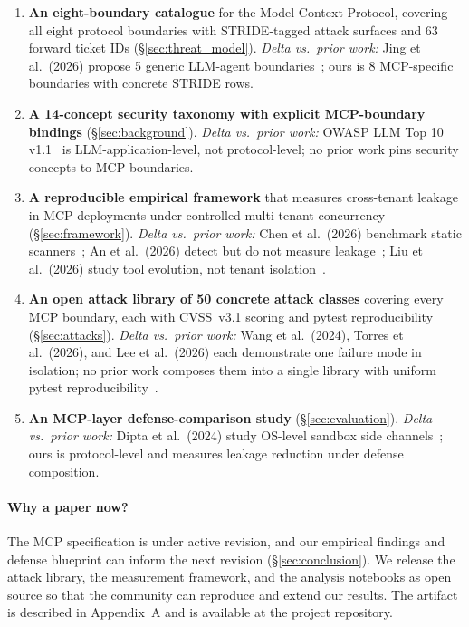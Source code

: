 \begin{enumerate}
  \item \textbf{An eight-boundary catalogue} for the Model Context
        Protocol, covering all eight protocol boundaries with
        STRIDE-tagged attack surfaces and 63 forward ticket IDs
        (\S\ref{sec:threat_model}). \emph{Delta vs.\ prior work:}
        Jing et al.~(2026) propose 5 generic LLM-agent
        boundaries~\cite{jing_2026_isolation}; ours is 8
        MCP-specific boundaries with concrete STRIDE rows.
  \item \textbf{A 14-concept security taxonomy with explicit
        MCP-boundary bindings} (\S\ref{sec:background}).
        \emph{Delta vs.\ prior work:} OWASP LLM Top 10
        v1.1~\cite{owasp_llm_top10_v11} is LLM-application-level,
        not protocol-level; no prior work pins security concepts
        to MCP boundaries.
  \item \textbf{A reproducible empirical framework} that measures
        cross-tenant leakage in MCP deployments under controlled
        multi-tenant concurrency (\S\ref{sec:framework}).
        \emph{Delta vs.\ prior work:} Chen et al.~(2026)
        benchmark static scanners~\cite{chen_2026_mcp_security};
        An et al.~(2026) detect but do not measure
        leakage~\cite{an_2026_flowguard}; Liu et al.~(2026) study
        tool evolution, not tenant
        isolation~\cite{liu_2026_mcpevol}.
  \item \textbf{An open attack library of 50 concrete attack
        classes} covering every MCP boundary, each with CVSS~v3.1
        scoring and pytest reproducibility (\S\ref{sec:attacks}).
        \emph{Delta vs.\ prior work:} Wang et al.~(2024),
        Torres et al.~(2026), and Lee et al.~(2026) each
        demonstrate one failure mode in isolation; no prior work
        composes them into a single library with uniform pytest
        reproducibility~\cite{wang_2024_toolcommander,
        torres_2026_memory,lee_2026_webmcp}.
  \item \textbf{An MCP-layer defense-comparison study}
        (\S\ref{sec:evaluation}). \emph{Delta vs.\ prior work:}
        Dipta et al.~(2024) study OS-level sandbox side
        channels~\cite{dipta_2024_sandbox}; ours is
        protocol-level and measures leakage reduction under
        defense composition.
\end{enumerate}

\paragraph{Why a paper now?}
The MCP specification is under active revision, and our
empirical findings and defense blueprint can inform the next
revision (\S\ref{sec:conclusion}). We release the attack library,
the measurement framework, and the analysis notebooks as open
source so that the community can reproduce and extend our
results. The artifact is described in Appendix~A and is
available at the project repository.

